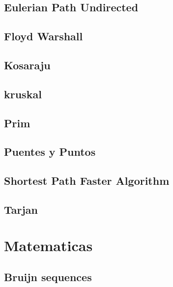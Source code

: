 \subsection{Eulerian Path Undirected}
\raggedbottom
\hrulefill
\subsection{Floyd Warshall}
\raggedbottom
\hrulefill
\subsection{Kosaraju}
\raggedbottom
\hrulefill
\subsection{kruskal}
\raggedbottom
\hrulefill
\subsection{Prim}
\raggedbottom
\hrulefill
\subsection{Puentes y Puntos}
\raggedbottom
\hrulefill
\subsection{Shortest Path Faster Algorithm}
\raggedbottom
\hrulefill
\subsection{Tarjan}
\raggedbottom
\hrulefill

\section{Matematicas}
\subsection{Bruijn sequences}
\raggedbottom
\hrulefill
